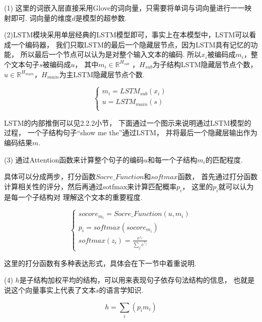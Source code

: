 \documentclass[bachelor,adobefonts]{jnuthesis}
\begin{document}
(1) 这里的词嵌入层直接采用Glove的词向量，只需要将单词与词向量进行一一映射即可.
词向量的维度$d$是模型的超参数.

(2)LSTM模块采用单层经典的LSTM模型即可，事实上在本模型中，LSTM可以看成一个编码器，
我们只取LSTM的最后一个隐藏层节点，因为LSTM具有记忆的功能，
所以最后一个节点可以认为是对整个输入文本的编码.
所以$x_{i}$被编码成$m_{i}$，整个文本句子$s$被编码成$u$，
其中$m_{i} \in \mathbb{R}^{H_{sub}}$ ，$H_{sub}$为子结构LSTM隐藏层节点个数，
$u \in \mathbb{R}^{H_{main}}$，$H_{main}$为主LSTM隐藏层节点个数.

\begin{equation}
\left\{
  \begin{array}{l}
   m_{i} = LSTM_{sub}(x_{i}) \\ 
   u = LSTM_{main}(s) \\ 
  \end{array}
  \right.
\end{equation}

LSTM的内部推倒可以见2.2.2小节，
下面通过一个图示来说明通过LSTM模型的过程，
一个子结构句子“show me the”通过LSTM，
并将最后一个隐藏层输出作为编码结果$m$.


(3)
通过Attention函数来计算整个句子的编码$u$和每一个子结构$m_{i}$的匹配程度.

具体可以分成两步，打分函数$Socre\_Function$和$softmax$函数，
首先通过打分函数计算相关性的评分，然后再通过sotfmax来计算匹配概率$p_{i}$，
这里的$p_{i}$就可以认为是每一个子结构对
理解这个文本的重要程度.

\begin{equation}
  \left\{
    \begin{array}{l}
     socore_{m_{i}} = Socre\_Function(u,m_{i}) \\ 
     p_{i} = softmax(socore_{m_{i}}) \\ 
     softmax(z_{i}) = \frac{e^{z_{i}}}{\sum_{j} e^{z_{j}}}
    \end{array}
  \right.
\end{equation}

这里的打分函数有多种表达形式，具体会在下一节中着重说明.

(4)
$h$是子结构加权平均的结构，可以用来表现句子依存句法结构的信息，
也就是说这个向量事实上代表了文本$s$的语言学知识.

\begin{equation}
  h = \sum_{i}(p_{i}m_{i})
\end{equation}
\end{document}
